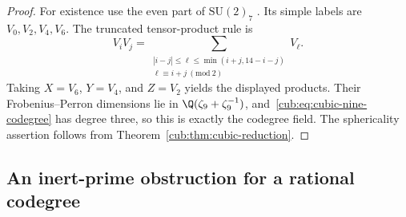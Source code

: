 \begin{proof}
For existence use the even part of $\mathrm{SU}(2)_7$
\cite[Section~5.3.10]{RSW}. Its simple labels are $V_0,V_2,V_4,V_6$.
The truncated tensor-product rule is
\[
 V_i V_j=\sum_{\substack{|i-j|\le\ell\le\min(i+j,14-i-j)\\
                           \ell\equiv i+j\ (\mathrm{mod}\ 2)}}V_\ell.
\]
Taking $X=V_6$, $Y=V_4$, and $Z=V_2$ yields the displayed products.
Their Frobenius--Perron dimensions lie in $\Q(\zeta_9+\zeta_9^{-1})$,
and~\eqref{cub:eq:cubic-nine-codegree} has degree three, so this is exactly
the codegree field. The sphericality assertion follows from
Theorem~\ref{cub:thm:cubic-reduction}.
\end{proof}
\subsection{An inert-prime obstruction for a rational codegree}

